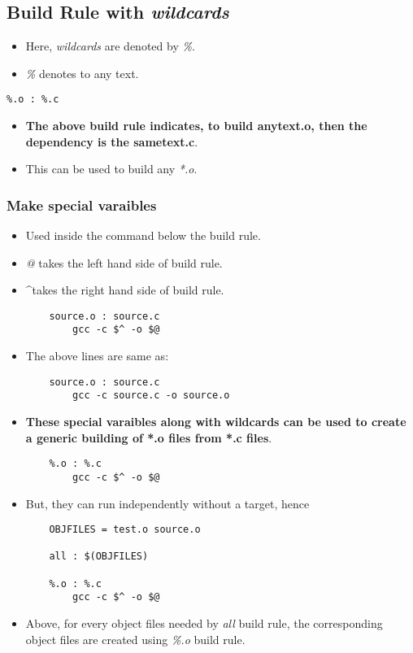 \documentclass{article}
\begin{document}
\subsection{Build Rule with \emph{wildcards}}
\begin{itemize}
    \item Here, \emph{wildcards} are denoted by \emph{\%}.
    \item \emph{\%} denotes to any text.
\end{itemize}
\begin{verbatim}
%.o : %.c
\end{verbatim}
\begin{itemize}
    \item \textbf{The above build rule indicates, to build anytext.o, then the dependency is the sametext.c}.
    \item This can be used to build any \emph{*.o}.
\end{itemize}



\subsubsection{Make special varaibles}
\begin{itemize}
    \item Used inside the command below the build rule.
    \item \emph{@} takes the left hand side of build rule.
    \item \textasciicircum takes the right hand side of build rule.
          \begin{verbatim}
    source.o : source.c
        gcc -c $^ -o $@
    \end{verbatim}
    \item The above lines are same as:
          \begin{verbatim}
    source.o : source.c
        gcc -c source.c -o source.o
    \end{verbatim}
    \item \textbf{These special varaibles along with wildcards can be used to create a generic building of *.o files from *.c files}.
          \begin{verbatim}
    %.o : %.c
        gcc -c $^ -o $@
    \end{verbatim}
    \item But, they can run independently without a target, hence
          \begin{verbatim}
    OBJFILES = test.o source.o

    all : $(OBJFILES)
    
    %.o : %.c
        gcc -c $^ -o $@
    \end{verbatim}
    \item Above, for every object files needed by \emph{all} build rule, the corresponding object files are created using \emph{\%.o} build rule.
\end{itemize}
\end{document}
